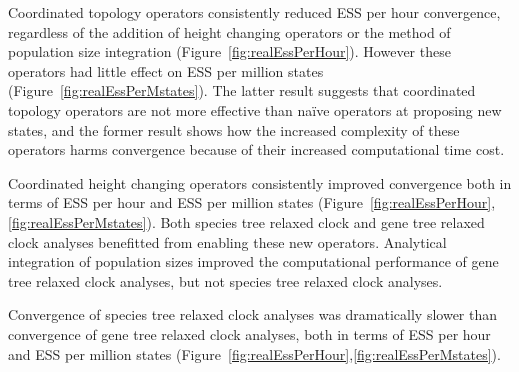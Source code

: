 \documentclass[12pt]{article}
\begin{document}
Coordinated topology operators consistently reduced ESS per hour convergence,
regardless of the addition of height changing operators or the method of
population size integration (Figure~\ref{fig:realEssPerHour}). However these
operators had little effect on ESS per million states (Figure~\ref{fig:realEssPerMstates}).
The latter result suggests that coordinated topology operators are not more
effective than na\"ive operators at proposing new states, and the former result
shows how the increased complexity of these operators harms convergence because
of their increased computational time cost.

Coordinated height changing operators consistently improved convergence both in terms
of ESS per hour and ESS per million states (Figure~\ref{fig:realEssPerHour},\ref{fig:realEssPerMstates}).
Both species tree relaxed clock and gene tree relaxed clock analyses benefitted
from enabling these new operators. Analytical integration of population sizes
improved the computational performance of gene tree relaxed clock analyses, but
not species tree relaxed clock analyses.

Convergence of species tree relaxed clock analyses was dramatically slower than
convergence of gene tree relaxed clock analyses, both in terms of ESS per hour
and ESS per million states
(Figure~\ref{fig:realEssPerHour},\ref{fig:realEssPerMstates}).
\end{document}
